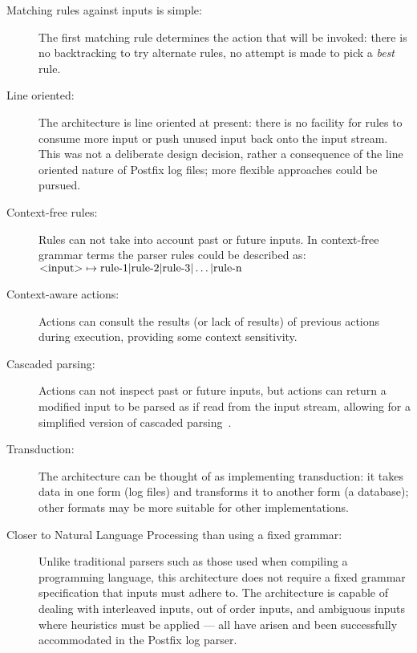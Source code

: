 \documentclass{svmult}
\begin{document}
\begin{description}

    \item [Matching rules against inputs is simple:]  The first matching
        rule determines the action that will be invoked: there is no
        backtracking to try alternate rules, no attempt is made to pick a
        \textit{best\/} rule.

    \item [Line oriented:]  The architecture is line oriented at present:
        there is no facility for rules to consume more input or push unused
        input back onto the input stream.  This was not a deliberate design
        decision, rather a consequence of the line oriented nature of
        Postfix log files; more flexible approaches could be pursued.

    \item [Context-free rules:]  Rules can not take into account past or
        future inputs.  In context-free grammar terms the parser rules
        could be described as:
        \newline{}$\text{\textless{}input\textgreater{}} \mapsto
        \text{rule-1} | \text{rule-2} | \text{rule-3} | \dots |
        \text{rule-n}$

    \item [Context-aware actions:] Actions can consult the results (or lack
        of results) of previous actions during execution, providing some
        context sensitivity.  
        
    \item [Cascaded parsing:] Actions can not inspect past or future
        inputs, but actions can return a modified input to be parsed as if
        read from the input stream, allowing for a simplified version of
        cascaded parsing~\cite{cascaded-parsing}.

    \item [Transduction:]  The architecture can be thought of as
        implementing transduction: it takes data in one form (log files)
        and transforms it to another form (a database); other formats may
        be more suitable for other implementations.

    \item [Closer to Natural Language Processing than using a fixed
        grammar:] Unlike traditional parsers such as those used when
        compiling a programming language, this architecture does not
        require a fixed grammar specification that inputs must adhere to.
        The architecture is capable of dealing with interleaved inputs, out
        of order inputs, and ambiguous inputs where heuristics must be
        applied --- all have arisen and been successfully accommodated in
        the Postfix log parser.

\end{description}
\end{document}
